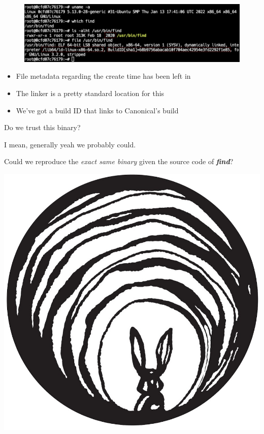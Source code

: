 \documentclass{beamer}
\begin{document}
\begin{frame}
    \begin{figure}
        \centering
        \includegraphics[width=\textwidth,keepaspectratio]{../resources/ubuntu-find.png}
    \end{figure}
    \begin{itemize}
        \item File metadata regarding the create time has been left in
        \item The linker is a pretty standard location for this
        \item We've got a build ID that links to Canonical's build
    \end{itemize}
\end{frame}

\begin{frame}
    \centering
    Do we trust this binary?
\end{frame}

\begin{frame}
    \centering
    I mean, generally yeah we probably could.
\end{frame}

\begin{frame}
    \centering
    Could we reproduce the \textit{exact same binary} given the source code of \textbf{\textit{find}}?
\end{frame}

\begin{frame}
    \centering
    \includegraphics[width=\textheight,keepaspectratio]{../resources/rabbit-hole.jpg}
\end{frame}
\end{document}
